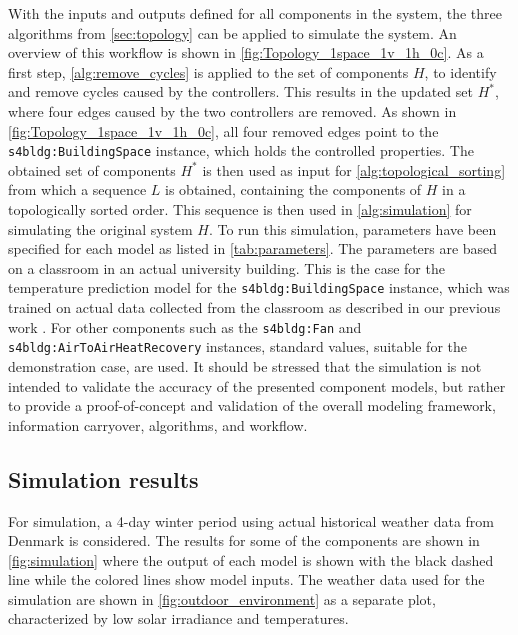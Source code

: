 With the inputs and outputs defined for all components in the system, the three algorithms from \autoref{sec:topology} can be applied to simulate the system. An overview of this workflow is shown in \autoref{fig:Topology_1space_1v_1h_0c}. As a first step, \autoref{alg:remove_cycles} is applied to the set of components $H$, to identify and remove cycles caused by the controllers. This results in the updated set $H^*$, where four edges caused by the two controllers are removed. As shown in \autoref{fig:Topology_1space_1v_1h_0c}, all four removed edges point to the \texttt{s4bldg:BuildingSpace} instance, which holds the controlled properties. The obtained set of components $H^*$ is then used as input for \autoref{alg:topological_sorting} from which a sequence $L$ is obtained, containing the components of $H$ in a topologically sorted order. This sequence is then used in \autoref{alg:simulation} for simulating the original system $H$. To run this simulation, parameters have been specified for each model as listed in \autoref{tab:parameters}. The parameters are based on a classroom in an actual university building. This is the case for the temperature prediction model for the \texttt{s4bldg:BuildingSpace} instance, which was trained on actual data collected from the classroom as described in our previous work \cite{BSABjoernskov2022,BSOBjoernskov2022}. For other components such as the \texttt{s4bldg:Fan} and \texttt{s4bldg:AirToAirHeatRecovery} instances, standard values, suitable for the demonstration case, are used. It should be stressed that the simulation is not intended to validate the accuracy of the presented component models, but rather to provide a proof-of-concept and validation of the overall modeling framework, information carryover, algorithms, and workflow.   


\subsection{Simulation results}

For simulation, a 4-day winter period using actual historical weather data from Denmark is considered. The results for some of the components are shown in \autoref{fig:simulation} where the output of each model is shown with the black dashed line while the colored lines show model inputs. The weather data used for the simulation are shown in \autoref{fig:outdoor_environment} as a separate plot, characterized by low solar irradiance and temperatures.



